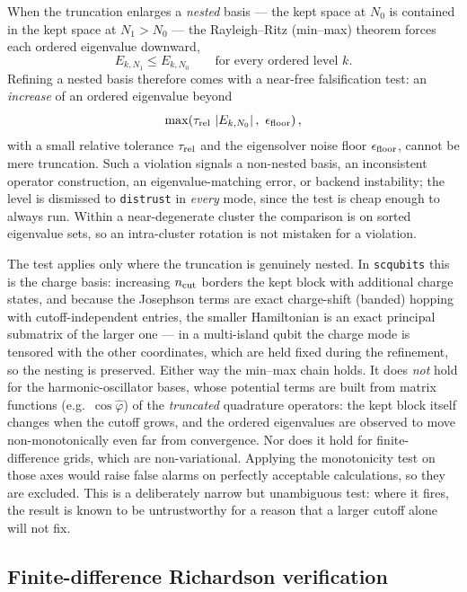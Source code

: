 \documentclass[11pt,a4paper]{article}
\newcommand{\abs}[1]{\left|#1\right|}
\newcommand{\ncut}{n_{\rm cut}}
\begin{document}
When the truncation enlarges a \emph{nested} basis --- the kept space at $N_0$ is contained in the kept space at $N_1>N_0$ --- the Rayleigh--Ritz (min--max) theorem forces each ordered eigenvalue downward,
\begin{equation}
  E_{k,N_1}\le E_{k,N_0}\qquad\text{for every ordered level }k.
\end{equation}
Refining a nested basis therefore comes with a near-free falsification test: an \emph{increase} of an ordered eigenvalue beyond
\begin{equation}
  \max\!\left(\tau_{\rm rel}\,\abs{E_{k,N_0}},\ \epsilon_{\rm floor}\right),
\end{equation}
with a small relative tolerance $\tau_{\rm rel}$ and the eigensolver noise floor $\epsilon_{\rm floor}$, cannot be mere truncation.  Such a violation signals a non-nested basis, an inconsistent operator construction, an eigenvalue-matching error, or backend instability; the level is dismissed to \texttt{distrust} in \emph{every} mode, since the test is cheap enough to always run.  Within a near-degenerate cluster the comparison is on sorted eigenvalue sets, so an intra-cluster rotation is not mistaken for a violation.

The test applies only where the truncation is genuinely nested.  In \texttt{scqubits} this is the charge basis: increasing $\ncut$ borders the kept block with additional charge states, and because the Josephson terms are exact charge-shift (banded) hopping with cutoff-independent entries, the smaller Hamiltonian is an exact principal submatrix of the larger one --- in a multi-island qubit the charge mode is tensored with the other coordinates, which are held fixed during the refinement, so the nesting is preserved.  Either way the min--max chain holds.  It does \emph{not} hold for the harmonic-oscillator bases, whose potential terms are built from matrix functions (e.g.\ $\cos\hat\varphi$) of the \emph{truncated} quadrature operators: the kept block itself changes when the cutoff grows, and the ordered eigenvalues are observed to move non-monotonically even far from convergence.  Nor does it hold for finite-difference grids, which are non-variational.  Applying the monotonicity test on those axes would raise false alarms on perfectly acceptable calculations, so they are excluded.  This is a deliberately narrow but unambiguous test: where it fires, the result is known to be untrustworthy for a reason that a larger cutoff alone will not fix.

\subsection{Finite-difference Richardson verification}
\end{document}
